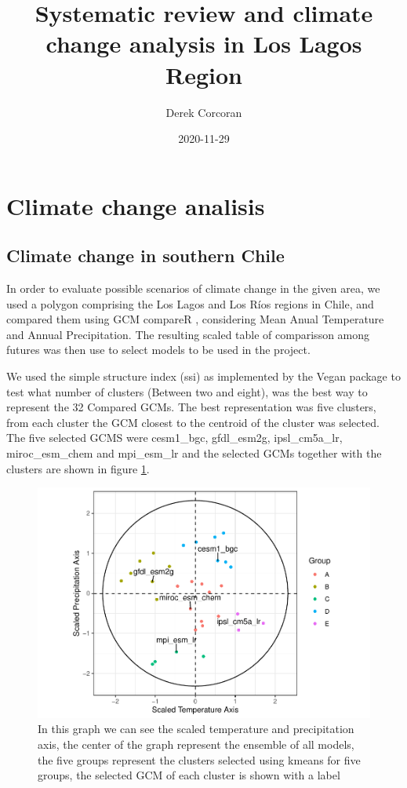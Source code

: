 \documentclass[]{article}
\title{Systematic review and climate change analysis in Los Lagos Region}
\author{Derek Corcoran}
\date{2020-11-29}
\begin{document}
\maketitle

\hypertarget{climate-change-analisis}{%
\section{Climate change analisis}\label{climate-change-analisis}}

\hypertarget{climate-change-in-southern-chile}{%
\subsection{Climate change in southern Chile}\label{climate-change-in-southern-chile}}

In order to evaluate possible scenarios of climate change in the given area, we used a polygon comprising the Los Lagos and Los Ríos regions in Chile, and compared them using GCM compareR \citep{fajardo2020gcm}, considering Mean Anual Temperature and Annual Precipitation. The resulting scaled table of comparisson among futures was then use to select models to be used in the project.

We used the simple structure index (ssi) as implemented by the Vegan package \citep{Oksanen_2019, dolnicar1999tale} to test what number of clusters (Between two and eight), was the best way to represent the 32 Compared GCMs. The best representation was five clusters, from each cluster the GCM closest to the centroid of the cluster was selected. The five selected GCMS were cesm1\_bgc, gfdl\_esm2g, ipsl\_cm5a\_lr, miroc\_esm\_chem and mpi\_esm\_lr and the selected GCMs together with the clusters are shown in figure \ref{fig:SelectedGCMs}.

\begin{figure}
\centering
\includegraphics{Review_and_climate_files/figure-latex/SelectedGCMs-1.pdf}
\caption{\label{fig:SelectedGCMs}In this graph we can see the scaled temperature and precipitation axis, the center of the graph represent the ensemble of all models, the five groups represent the clusters selected using kmeans for five groups, the selected GCM of each cluster is shown with a label}
\end{figure}
\end{document}
